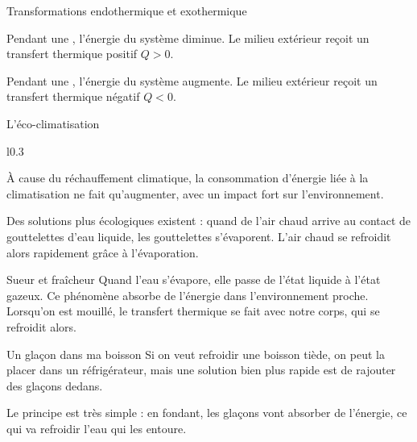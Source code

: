 \begin{doc}{Transformations endothermique et exothermique}
  \vspace*{-20pt}
  \begin{encart}
    \begin{listePoints}
      \item Pendant une , l'énergie du système diminue. 
      Le milieu extérieur reçoit un transfert thermique positif $Q > 0$.
      \item Pendant une , l'énergie du système augmente.
      Le milieu extérieur reçoit un transfert thermique négatif $Q < 0$.
    \end{listePoints}
  \end{encart}
\end{doc}


\newpage
\vspace*{-36pt}
\begin{doc}{L'éco-climatisation}
  \label{doc:climatisation}
  \vspace*{-18pt}
  \begin{wrapfigure}{l}{0.3\linewidth}
    \vspace*{-15pt}
    \centering
  \end{wrapfigure}
  À cause du réchauffement climatique, la consommation d'énergie liée à la climatisation ne fait qu'augmenter, avec un impact fort sur l'environnement.
  
  Des solutions plus écologiques existent : quand de l'air chaud arrive au contact de gouttelettes d'eau liquide, les gouttelettes s'évaporent.
  L'air chaud se refroidit alors rapidement grâce à l'évaporation.
\end{doc}

\begin{doc}{Sueur et fraîcheur}
  \label{doc:evaporation}
  Quand l'eau s'évapore, elle passe de l'état liquide à l'état gazeux.
  Ce phénomène absorbe de l'énergie dans l'environnement proche.
  Lorsqu'on est mouillé, le transfert thermique se fait avec notre corps, qui se refroidit alors.
\end{doc}

\begin{doc}{Un glaçon dans ma boisson}
  \label{doc:glacons}
  Si on veut refroidir une boisson tiède, on peut la placer dans un réfrigérateur, mais une solution bien plus rapide est de rajouter des glaçons dedans.
  
  Le principe est très simple : en fondant, les glaçons vont absorber de l'énergie, ce qui va refroidir l'eau qui les entoure.
\end{doc}


